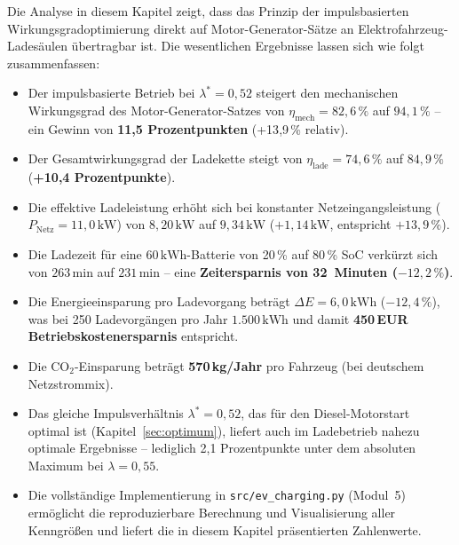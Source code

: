 ﻿\documentclass[a4paper,12pt]{article}
\begin{document}
Die Analyse in diesem Kapitel zeigt, dass das Prinzip der
impulsbasierten Wirkungsgradoptimierung direkt auf Motor-Generator-Sätze
an Elektrofahrzeug-Ladesäulen übertragbar ist. Die wesentlichen
Ergebnisse lassen sich wie folgt zusammenfassen:

\begin{itemize}
  \item Der impulsbasierte Betrieb bei $\lambda^* = 0{,}52$ steigert
    den mechanischen Wirkungsgrad des Motor-Generator-Satzes von
    $\eta_\text{mech} = 82{,}6\,\%$ auf $94{,}1\,\%$ --
    ein Gewinn von \textbf{11{,}5 Prozentpunkten} (+13{,}9\,\% relativ).

  \item Der Gesamtwirkungsgrad der Ladekette steigt von
    $\eta_\text{lade} = 74{,}6\,\%$ auf $84{,}9\,\%$
    (\textbf{+10{,}4 Prozentpunkte}).

  \item Die effektive Ladeleistung erhöht sich bei konstanter
    Netzeingangsleistung ($P_\text{Netz} = 11{,}0\,\text{kW}$)
    von $8{,}20\,\text{kW}$ auf $9{,}34\,\text{kW}$
    (\textbf{$+1{,}14\,\text{kW}$}, entspricht $+13{,}9\,\%$).

  \item Die Ladezeit für eine $60\,\text{kWh}$-Batterie von
    20\,\% auf 80\,\% SoC verkürzt sich von $263\,\text{min}$
    auf $231\,\text{min}$ -- eine \textbf{Zeitersparnis von
    32~Minuten ($-12{,}2\,\%$)}.

  \item Die Energieeinsparung pro Ladevorgang beträgt
    $\Delta E = 6{,}0\,\text{kWh}$ ($-12{,}4\,\%$), was bei
    250 Ladevorgängen pro Jahr $1.500\,\text{kWh}$
    und damit \textbf{450\,EUR Betriebskostenersparnis} entspricht.

  \item Die CO$_2$-Einsparung beträgt \textbf{570\,kg/Jahr}
    pro Fahrzeug (bei deutschem Netzstrommix).

  \item Das gleiche Impulsverhältnis $\lambda^* = 0{,}52$,
    das für den Diesel-Motorstart optimal ist (Kapitel~\ref{sec:optimum}),
    liefert auch im Ladebetrieb nahezu optimale Ergebnisse --
    lediglich 2{,}1 Prozentpunkte unter dem absoluten Maximum
    bei $\lambda = 0{,}55$.

  \item Die vollständige Implementierung in \texttt{src/ev\_charging.py}
    (Modul~5) ermöglicht die reproduzierbare Berechnung und Visualisierung
    aller Kenngrößen und liefert die in diesem Kapitel präsentierten
    Zahlenwerte.
\end{itemize}
\end{document}

